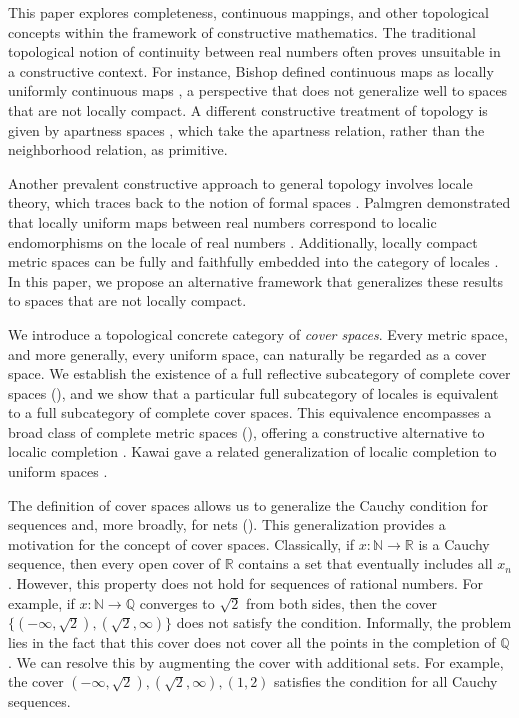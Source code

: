 \documentclass[pdflatex,sn-mathphys-num]{sn-jnl}
\theoremstyle{definition}
\theoremstyle{remark}
\numberwithin{figure}{section}
\begin{document}
This paper explores completeness, continuous mappings, and other topological concepts within the framework of constructive mathematics.
The traditional topological notion of continuity between real numbers often proves unsuitable in a constructive context.
For instance, Bishop defined continuous maps as locally uniformly continuous maps \cite[Chapter 2, Definition 9]{bishop},
a perspective that does not generalize well to spaces that are not locally compact.
A different constructive treatment of topology is given by apartness spaces \cite{bridges-vita-apartness},
which take the apartness relation, rather than the neighborhood relation, as primitive.

Another prevalent constructive approach to general topology involves locale theory, which traces back to the notion of formal spaces \cite{fourman-grayson-formal-spaces}.
Palmgren demonstrated that locally uniform maps between real numbers correspond to localic endomorphisms on the locale of real numbers \cite{palmgren-cont}.
Additionally, locally compact metric spaces can be fully and faithfully embedded into the category of locales \cite{palmgren-metric-locales}.
In this paper, we propose an alternative framework that generalizes these results to spaces that are not locally compact.

We introduce a topological concrete category of \emph{cover spaces}.
Every metric space, and more generally, every uniform space, can naturally be regarded as a cover space.
We establish the existence of a full reflective subcategory of complete cover spaces (),
and we show that a particular full subcategory of locales is equivalent to a full subcategory of complete cover spaces.
This equivalence encompasses a broad class of complete metric spaces (),
offering a constructive alternative to localic completion \cite{localic-completion,vickers-localic-completion-ii}.
Kawai gave a related generalization of localic completion to uniform spaces \cite{kawai-localic-uniform}.

The definition of cover spaces allows us to generalize the Cauchy condition for sequences and, more broadly, for nets ().
This generalization provides a motivation for the concept of cover spaces.
Classically, if $x : \mathbb{N} \to \mathbb{R}$ is a Cauchy sequence, then every open cover of $\mathbb{R}$ contains a set that eventually includes all $x_n$.
However, this property does not hold for sequences of rational numbers.
For example, if $x : \mathbb{N} \to \mathbb{Q}$ converges to $\sqrt{2}$ from both sides, then the cover $\{ (-\infty,\sqrt{2}), (\sqrt{2},\infty) \}$ does not satisfy the condition.
Informally, the problem lies in the fact that this cover does not cover all the points in the completion of $\mathbb{Q}$.
We can resolve this by augmenting the cover with additional sets.
For example, the cover ${ (-\infty, \sqrt{2}), (\sqrt{2}, \infty), (1,2) }$ satisfies the condition for all Cauchy sequences.
\end{document}
